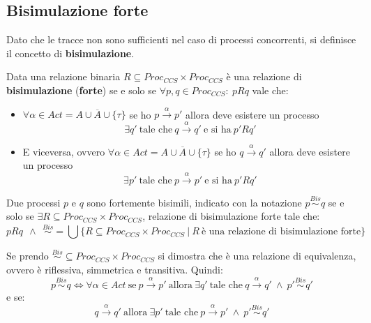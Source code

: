 \subsection{Bisimulazione forte}
Dato che le tracce non sono sufficienti nel caso di processi concorrenti, si
definisce il concetto di \textbf{bisimulazione}.
\begin{definizione}
    Data una relazione binaria $R \subseteq Proc_{CCS} \times Proc_{CCS}$ è una
    relazione di \textbf{bisimulazione} (\textbf{forte}) se e solo se
    $\forall p, q \in Proc_{CCS}: \ p R q$ vale che:
    \begin{itemize}
        \item $\forall \alpha \in Act = A \cup \overline{A} \cup \{\tau\}$ se ho
              $p \xrightarrow{\alpha} p'$ allora deve esistere un processo
              \begin{equation}
                  \exists q' \ \text{tale che} \ q \xrightarrow{\alpha} q' \ \text{e si ha} \ p'Rq'
              \end{equation}
        \item E viceversa, ovvero $\forall \alpha \in Act = A \cup \overline{A} \cup \{\tau\}$
              se ho $q \xrightarrow{\alpha} q'$ allora deve esistere un processo
              \begin{equation}
                  \exists p' \ \text{tale che} \ p \xrightarrow{\alpha} p' \ \text{e si ha} \ p'Rq'
              \end{equation}
    \end{itemize}
    Due processi $p$ e $q$ sono fortemente bisimili, indicato con la notazione
    $p \stackrel{Bis}{\sim} q$ se e solo se $\exists R \subseteq Proc_{CCS} \times Proc_{CCS}$,
    relazione di bisimulazione forte tale che:
    \begin{equation}
        p R q \ \ \land \ \
        \stackrel{Bis}{\sim} = \bigcup \{R \subseteq Proc_{CCS} \times Proc_{CCS} \ | \ R \ \text{è una relazione di bisimulazione forte}\}
    \end{equation}
\end{definizione}
\begin{teorema}
    Se prendo $\stackrel{Bis}{\sim}  \subseteq Proc_{CCS} \times Proc_{CCS}$ si
    dimostra che è una relazione di equivalenza, ovvero è riflessiva, simmetrica
    e transitiva. Quindi:
    \begin{equation}
        p \stackrel{Bis}{\sim} q \Longleftrightarrow \forall \alpha \in Act \ \text{se} \ p \xrightarrow{\alpha} p'
        \ \text{allora} \
        \exists q' \ \text{tale che} \ q \xrightarrow{\alpha} q' \ \land \ p' \stackrel{Bis}{\sim} q'
    \end{equation}
    e se:
    \begin{equation}
        q \xrightarrow{\alpha} q' \ \text{allora} \
        \exists p' \ \text{tale che} \ p \xrightarrow{\alpha} p' \ \land \ p' \stackrel{Bis}{\sim} q'
    \end{equation}
\end{teorema}
